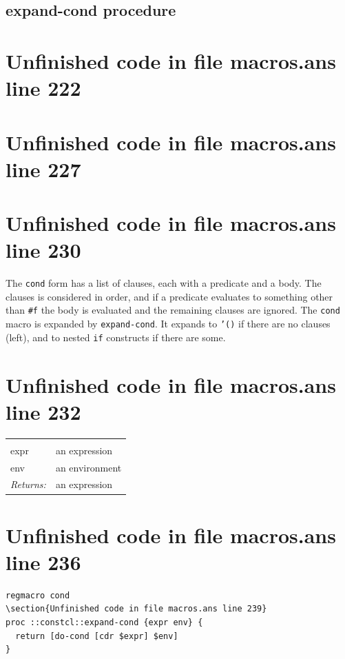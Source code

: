 \documentclass[twoside,9pt]{report}
\begin{document}
\subsection{expand-cond procedure}
\label{expand-cond-procedure}
\section{Unfinished code in file macros.ans line 222}

\section{Unfinished code in file macros.ans line 227}
\section{Unfinished code in file macros.ans line 230}

The \texttt{cond} form has a list of clauses, each with a predicate and a body. The clauses is considered in order, and if a predicate evaluates to something other than \texttt{\#f} the body is evaluated and the remaining clauses are ignored. The \texttt{cond} macro is expanded by \texttt{expand-cond}. It expands to \texttt{'()} if there are no clauses (left), and to nested \texttt{if} constructs if there are some.

\section{Unfinished code in file macros.ans line 232}
\noindent\begin{tabular}{ |p{1.9cm} p{8cm}| }
\hline
\rowcolor[HTML]{CCCCCC} \multicolumn{2}{|l|}{\bf expand-cond (internal)} \\
expr & an expression \\
env & an environment \\
\textit{Returns:} & an expression \\
\hline
\end{tabular}
\section{Unfinished code in file macros.ans line 236}
\begin{lstlisting}
regmacro cond
\section{Unfinished code in file macros.ans line 239}
proc ::constcl::expand-cond {expr env} {
  return [do-cond [cdr $expr] $env]
}
\end{lstlisting}
\end{document}
